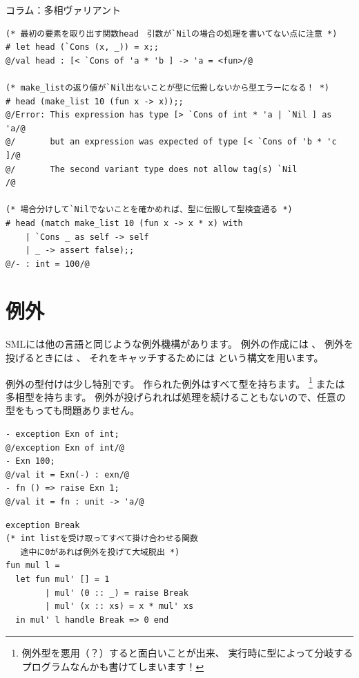 \documentclass[11pt,a4paper]{article}
\begin{document}
\begin{itembox}[l]{コラム：多相ヴァリアント}
\begin{lstlisting}[caption=多相ヴァリアントを用いたリスト構造(ocamlコード)]
(* 最初の要素を取り出す関数head　引数が`Nilの場合の処理を書いてない点に注意 *)
# let head (`Cons (x, _)) = x;;
@/val head : [< `Cons of 'a * 'b ] -> 'a = <fun>/@

(* make_listの返り値が`Nil出ないことが型に伝搬しないから型エラーになる！ *)
# head (make_list 10 (fun x -> x));;
@/Error: This expression has type [> `Cons of int * 'a | `Nil ] as 'a/@
@/       but an expression was expected of type [< `Cons of 'b * 'c ]/@
@/       The second variant type does not allow tag(s) `Nil          /@

(* 場合分けして`Nilでないことを確かめれば、型に伝搬して型検査通る *)
# head (match make_list 10 (fun x -> x * x) with
    | `Cons _ as self -> self
    | _ -> assert false);;
@/- : int = 100/@
\end{lstlisting}

\end{itembox}

\section{例外}

SMLには他の言語と同じような例外機構があります。
例外の作成には 、
例外を投げるときには 、
それをキャッチするためには
という構文を用います。

例外の型付けは少し特別です。
作られた例外はすべて型を持ちます。
\footnote{例外型を悪用（？）すると面白いことが出来、
実行時に型によって分岐するプログラムなんかも書けてしまいます\cite{use-exn}！}
または多相型を持ちます。
例外が投げられれば処理を続けることもないので、任意の型をもっても問題ありません。

\begin{minipage}[htb]{0.4\linewidth}
\begin{lstlisting}[caption=例外の型付け]
- exception Exn of int;
@/exception Exn of int/@
- Exn 100;
@/val it = Exn(-) : exn/@
- fn () => raise Exn 1;
@/val it = fn : unit -> 'a/@
\end{lstlisting}
\end{minipage}
\hfill
\begin{minipage}[htb]{0.6\linewidth}
\begin{lstlisting}[caption=例外を用いたプログラム例]
exception Break
(* int listを受け取ってすべて掛け合わせる関数　
   途中に0があれば例外を投げて大域脱出 *)
fun mul l =
  let fun mul' [] = 1
        | mul' (0 :: _) = raise Break
        | mul' (x :: xs) = x * mul' xs
  in mul' l handle Break => 0 end
\end{lstlisting}
\end{minipage}
\end{document}
